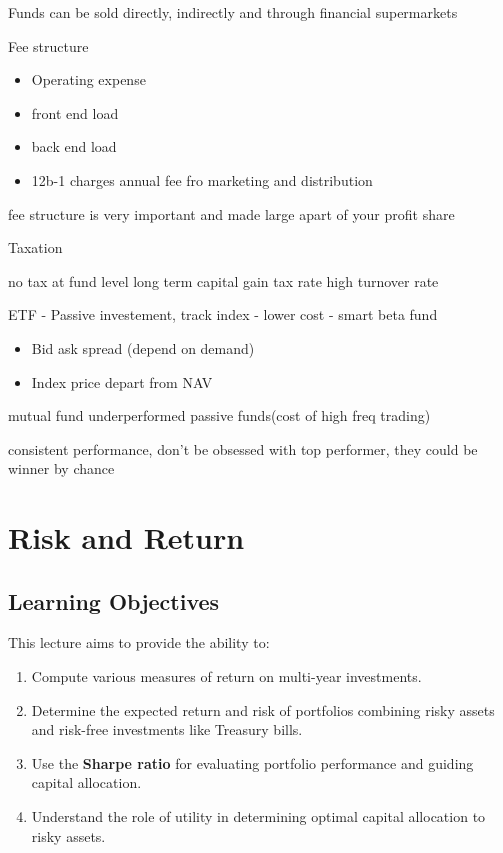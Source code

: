 \documentclass[
]{book}
\providecommand{\tightlist}{%
  \setlength{\itemsep}{0pt}\setlength{\parskip}{0pt}}
\begin{document}
Funds can be sold directly, indirectly and through financial
supermarkets

Fee structure

\begin{itemize}
\tightlist
\item
  Operating expense
\item
  front end load
\item
  back end load
\item
  12b-1 charges annual fee fro marketing and distribution
\end{itemize}

fee structure is very important and made large apart of your profit
share

Taxation

no tax at fund level long term capital gain tax rate high turnover rate

ETF - Passive investement, track index - lower cost - smart beta fund

\begin{itemize}
\tightlist
\item
  Bid ask spread (depend on demand)
\item
  Index price depart from NAV
\end{itemize}

mutual fund underperformed passive funds(cost of high freq trading)

consistent performance, don't be obsessed with top performer, they could
be winner by chance

\hypertarget{ch2}{%
\chapter{Risk and Return}\label{ch2}}

\hypertarget{learning-objectives}{%
\section{Learning Objectives}\label{learning-objectives}}

This lecture aims to provide the ability to:

\begin{enumerate}
\def\labelenumi{\arabic{enumi}.}
\tightlist
\item
  Compute various measures of return on multi-year investments.
\item
  Determine the expected return and risk of portfolios combining risky
  assets and risk-free investments like Treasury bills.
\item
  Use the \textbf{Sharpe ratio} for evaluating portfolio performance and
  guiding capital allocation.
\item
  Understand the role of utility in determining optimal capital
  allocation to risky assets.
\end{enumerate}
\end{document}
